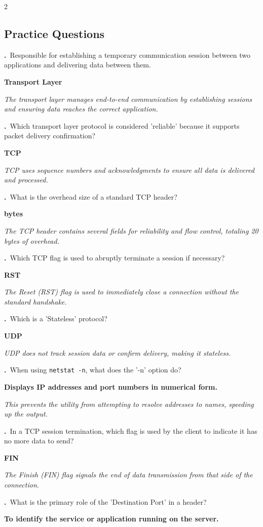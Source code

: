 \documentclass[9pt]{article}
\newcommand{\answer}[1]{%
  \par\nobreak\vspace{1pt}%
  \begin{tcolorbox}[
    colback=AnswerRed,
    colframe=AnswerRed,
    boxrule=0pt,
    arc=0pt,
    left=4pt, right=4pt,
    top=0.5pt, bottom=0.5pt,
    before skip=0pt,
    after skip=0pt
  ]
  {\footnotesize\bfseries\color{white}\RaggedRight #1}
  \end{tcolorbox}
}
\newcommand{\explain}[1]{%
  \par\nobreak\vspace{0pt}%
  \begin{tcolorbox}[
    colback=LightBlueBg,
    colframe=SoftBlue!30,
    boxrule=0.3pt,
    arc=2pt,
    left=4pt, right=4pt,
    top=1pt, bottom=1pt,
    before skip=1pt,
    after skip=2pt
  ]
  {\footnotesize\color{MutedGray}\RaggedRight\itshape #1}
  \end{tcolorbox}
}
\newcounter{qnum}
\newcommand{\question}[1]{%
  \Needspace{4\baselineskip}%
  \stepcounter{qnum}%
  \par\vspace{3pt}%
  {\footnotesize\bfseries\color{themeColor}\theqnum.}\ {\footnotesize #1}%
}
\newcommand{\questioncolumns}[1]{%
  \begin{multicols}{2}
  \subsection*{Practice Questions}
  #1
  \end{multicols}
}
\begin{document}
\questioncolumns{
\question{Responsible for establishing a temporary communication session between two applications and delivering data between them.}

\answer{Transport Layer}

\explain{The transport layer manages end-to-end communication by establishing sessions and ensuring data reaches the correct application.}


\question{Which transport layer protocol is considered 'reliable' because it supports packet delivery confirmation?}

\answer{TCP}

\explain{TCP uses sequence numbers and acknowledgments to ensure all data is delivered and processed.}


\question{What is the overhead size of a standard TCP header?}

\answer{20 bytes}

\explain{The TCP header contains several fields for reliability and flow control, totaling 20 bytes of overhead.}


\question{Which TCP flag is used to abruptly terminate a session if necessary?}

\answer{RST}

\explain{The Reset (RST) flag is used to immediately close a connection without the standard handshake.}


\question{Which is a 'Stateless' protocol?}

\answer{UDP}

\explain{UDP does not track session data or confirm delivery, making it stateless.}


\question{When using \texttt{netstat -n}, what does the '-n' option do?}

\answer{Displays IP addresses and port numbers in numerical form.}

\explain{This prevents the utility from attempting to resolve addresses to names, speeding up the output.}


\question{In a TCP session termination, which flag is used by the client to indicate it has no more data to send?}

\answer{FIN}

\explain{The Finish (FIN) flag signals the end of data transmission from that side of the connection.}


\question{What is the primary role of the 'Destination Port' in a header?}

\answer{To identify the service or application running on the server.}

}
\end{document}
